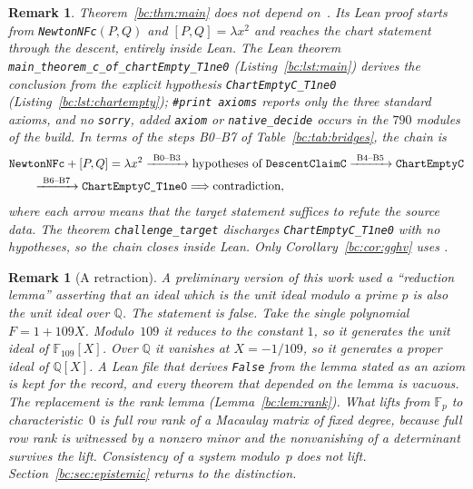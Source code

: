 \documentclass[a4paper,11pt]{article}
\theoremstyle{jsplain}
\theoremstyle{jsdef}
\theoremstyle{jsrem}
\newtheorem{remark}[theorem]{Remark}
\begin{document}
\begin{remark}\label{bc:rem:conditional}
Theorem~\ref{bc:thm:main} does not depend on~\cite{GGHV}. Its Lean proof starts from \texttt{NewtonNFc}$(P,Q)$ and $[P,Q]=\lambda x^2$ and reaches the chart statement through the descent, entirely inside Lean. The Lean theorem \texttt{main\_\allowbreak{}theorem\_\allowbreak{}c\_\allowbreak{}of\_\allowbreak{}\allowbreak chartEmpty\_\allowbreak{}T1ne0} (Listing~\ref{bc:lst:main}) derives the conclusion from the explicit hypothesis \texttt{ChartEmptyC\_\allowbreak{}T1ne0} (Listing~\ref{bc:lst:chartempty}); \texttt{\#print axioms} reports only the three standard axioms, and no \texttt{sorry}, added \texttt{axiom} or \texttt{native\_\allowbreak{}decide} occurs in the $790$ modules of the build. In terms of the steps B0--B7 of Table~\ref{bc:tab:bridges}, the chain is
\begin{align*}
&\texttt{NewtonNFc}+[P,Q]=\lambda x^2
\xrightarrow{\ \text{B0--B3}\ }\text{hypotheses of }\texttt{DescentClaimC}
\xrightarrow{\ \text{B4--B5}\ }\texttt{ChartEmptyC}\\
&\qquad\xrightarrow{\ \text{B6--B7}\ }\texttt{ChartEmptyC\_\allowbreak{}T1ne0}
\Longrightarrow\text{contradiction},
\end{align*}
where each arrow means that the target statement suffices to refute the source data. The theorem \texttt{challenge\_\allowbreak{}target} discharges \texttt{ChartEmptyC\_\allowbreak{}T1ne0} with no hypotheses, so the chain closes inside Lean. Only Corollary~\ref{bc:cor:gghv} uses \cite[Prop.~4.3]{GGHV}.
\end{remark}

\begin{remark}[A retraction]\label{bc:rem:retraction}
A preliminary version of this work used a ``reduction lemma'' asserting that an ideal which is the unit ideal modulo a prime $p$ is also the unit ideal over $\mathbb{Q}$. The statement is false. Take the single polynomial $F=1+109X$. Modulo~$109$ it reduces to the constant $1$, so it generates the unit ideal of $\mathbb{F}_{109}[X]$. Over $\mathbb{Q}$ it vanishes at $X=-1/109$, so it generates a proper ideal of $\mathbb{Q}[X]$. A Lean file that derives \texttt{False} from the lemma stated as an axiom is kept for the record, and every theorem that depended on the lemma is vacuous. The replacement is the rank lemma (Lemma~\ref{bc:lem:rank}). What lifts from $\mathbb{F}_p$ to characteristic~$0$ is full row rank of a Macaulay matrix of fixed degree, because full row rank is witnessed by a nonzero minor and the nonvanishing of a determinant survives the lift. Consistency of a system modulo~$p$ does not lift. Section~\ref{bc:sec:epistemic} returns to the distinction.
\end{remark}
\end{document}
